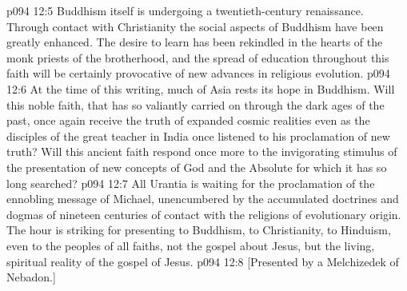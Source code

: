 \vs p094 12:5 Buddhism itself is undergoing a twentieth\hyp{}century renaissance. Through contact with Christianity the social aspects of Buddhism have been greatly enhanced. The desire to learn has been rekindled in the hearts of the monk priests of the brotherhood, and the spread of education throughout this faith will be certainly provocative of new advances in religious evolution.
\vs p094 12:6 At the time of this writing, much of Asia rests its hope in Buddhism. Will this noble faith, that has so valiantly carried on through the dark ages of the past, once again receive the truth of expanded cosmic realities even as the disciples of the great teacher in India once listened to his proclamation of new truth? Will this ancient faith respond once more to the invigorating stimulus of the presentation of new concepts of God and the Absolute for which it has so long searched?
\pc \vs p094 12:7 All Urantia is waiting for the proclamation of the ennobling message of Michael, unencumbered by the accumulated doctrines and dogmas of nineteen centuries of contact with the religions of evolutionary origin. The hour is striking for presenting to Buddhism, to Christianity, to Hinduism, even to the peoples of all faiths, not the gospel about Jesus, but the living, spiritual reality of the gospel of Jesus.
\vsetoff
\vs p094 12:8 [Presented by a Melchizedek of Nebadon.]
